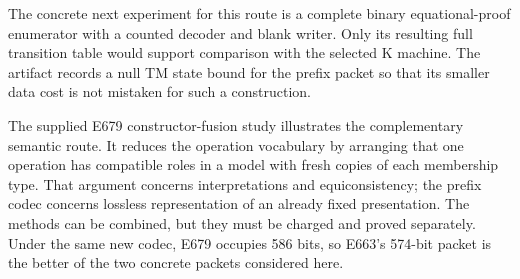 The concrete next experiment for this route is a complete binary
equational-proof enumerator with a counted decoder and blank writer.
Only its resulting full transition table would support comparison
with the selected K machine. The artifact records a null TM state
bound for the prefix packet so that its smaller data cost is not
mistaken for such a construction.

The supplied E679 constructor-fusion study illustrates the complementary
semantic route. It reduces the operation vocabulary by arranging that
one operation has compatible roles in a model with fresh copies of
each membership type. That argument concerns interpretations and
equiconsistency; the prefix codec concerns lossless representation of
an already fixed presentation. The methods can be combined, but they
must be charged and proved separately. Under the same new codec,
E679 occupies 586 bits, so E663's 574-bit packet is the better of the
two concrete packets considered here.
